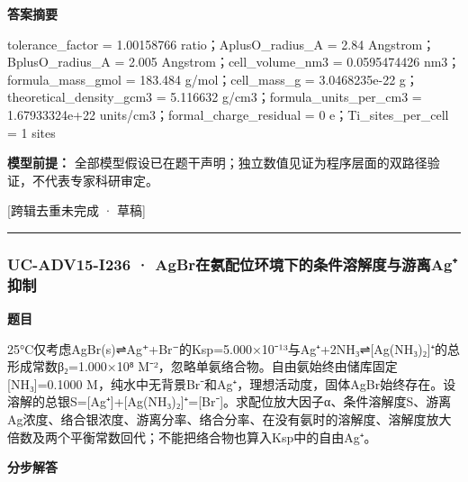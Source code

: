 \documentclass[UTF8,11pt,a4paper]{ctexart}
\begin{document}
\noindent\textbf{答案摘要}\par
tolerance\_factor = 1.00158766 ratio；AplusO\_radius\_A = 2.84 Angstrom；BplusO\_radius\_A = 2.005 Angstrom；cell\_volume\_nm3 = 0.0595474426 nm3；formula\_mass\_gmol = 183.484 g/mol；cell\_mass\_g = 3.0468235e-22 g；theoretical\_density\_gcm3 = 5.116632 g/cm3；formula\_units\_per\_cm3 = 1.67933324e+22 units/cm3；formal\_charge\_residual = 0 e；Ti\_sites\_per\_cell = 1 sites\par
\noindent\textbf{模型前提：}
全部模型假设已在题干声明；独立数值见证为程序层面的双路径验证，不代表专家科研审定。\par
\noindent\textcolor{red!65!black}{[跨辑去重未完成 · 草稿]} \par
\medskip\hrule\medskip
{}
\subsubsection*{UC-ADV15-I236 · AgBr在氨配位环境下的条件溶解度与游离Ag⁺抑制}
\noindent\textbf{题目}\par
25°C仅考虑AgBr(s)⇌Ag⁺+Br⁻的Ksp=5.000×10⁻¹³与Ag⁺+2NH₃⇌[Ag(NH₃)₂]⁺的总形成常数β₂=1.000×10⁸ M⁻²，忽略单氨络合物。自由氨始终由储库固定[NH₃]=0.1000 M，纯水中无背景Br⁻和Ag⁺，理想活动度，固体AgBr始终存在。设溶解的总银S=[Ag⁺]+[Ag(NH₃)₂]⁺=[Br⁻]。求配位放大因子α、条件溶解度S、游离Ag浓度、络合银浓度、游离分率、络合分率、在没有氨时的溶解度、溶解度放大倍数及两个平衡常数回代；不能把络合物也算入Ksp中的自由Ag⁺。\par
\medskip\noindent\textbf{分步解答}
\end{document}
